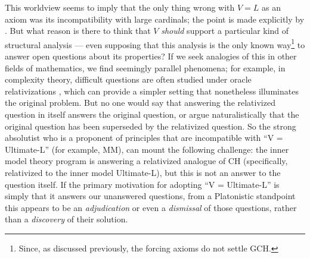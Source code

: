 \documentclass[letterpaper,12pt]{article}
\begin{document}
This worldview seems to imply that the only thing wrong with $V = L$ as an axiom was its incompatibility with large cardinals; the point is made explicitly by \cite{woodin2009continuum}. But what reason is there to think that $V$ \emph{should} support a particular kind of structural analysis --- even supposing that this analysis is the only known way\footnote{Since, as discussed previously, the forcing axioms do not settle GCH.} to answer open questions about its properties? If we seek analogies of this in other fields of mathematics, we find seemingly parallel phenomena; for example, in complexity theory, difficult questions are often studied under oracle relativizations \citep{fortnow1994role}, which can provide a simpler setting that nonetheless illuminates the original problem. But no one would say that answering the relativized question in itself answers the original question, or argue naturalistically that the original question has been superseded by the relativized question. So the strong absolutist who is a proponent of principles that are incompatible with ``V = Ultimate-L'' (for example, MM), can mount the following challenge: the inner model theory program is answering a relativized analogue of CH (specifically, relativized to the inner model Ultimate-L), but this is not an answer to the question itself. If the primary motivation for adopting ``V = Ultimate-L'' is simply that it answers our unanswered questions, from a Platonistic standpoint this appears to be an \emph{adjudication} or even a \emph{dismissal} of those questions, rather than a \emph{discovery} of their solution.
\end{document}
